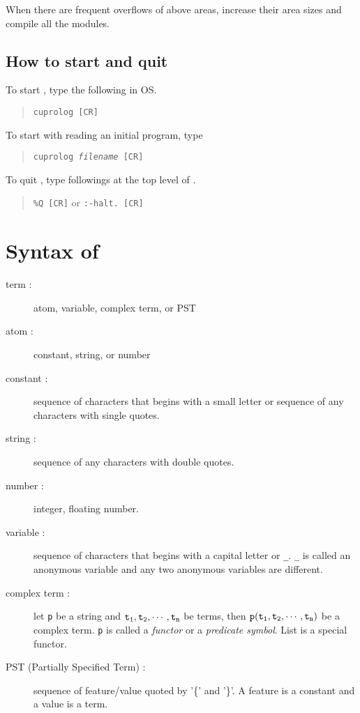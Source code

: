 When there are frequent overflows of above areas, increase their area
sizes and compile all the modules.

\subsection{How to start and quit \cuprolog}
To start \cuprolog, type the following in OS. 
\begin{quote}
	{\tt cuprolog [CR]}
\end{quote}
To start \cuprolog with reading an initial program, type
\begin{quote}
	{\tt cuprolog {\em filename} [CR]}
\end{quote}
To quit \cuprolog, type followings at the top level of \cuprolog.
\begin{quote}
	{\tt \%Q [CR]} or {\tt :-halt. [CR]} 
\end{quote}

\section{Syntax of \cuprolog}
\begin{description}
\item [term :] atom, variable, complex term, or PST 
\item [atom :] constant, string, or number
\item [constant :] sequence of characters that begins with a small
letter or sequence of any characters with single quotes.
\item [string :] sequence of any characters with double quotes.
\item [number :] integer, floating number.
\item [variable :] sequence of characters that begins with a capital
letter or {\tt \_}. 
{\tt \_} is called an anonymous variable and any two anonymous
variables are different.
\item [complex term :] let {\tt p} be a string and 
${\tt t_{1},t_{2},\cdots,t_{n}}$ be terms, then 
${\tt p(t_{1},t_{2},\cdots,t_{n})}$ be a complex term. 
{\tt p} is called a {\em functor} or a {\em predicate symbol}. 
List is a special functor. 
\item [PST (Partially Specified Term) :] sequence of feature/value
quoted by '\{' and '\}'. A feature is a constant and a value is a
term.
\end{description}

